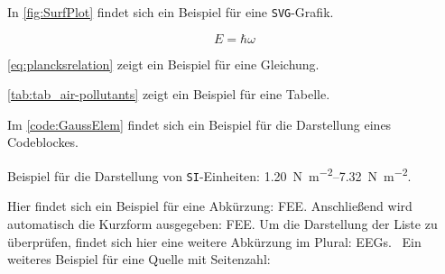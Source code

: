 \newpage
\lipsum[24]



In \autoref{fig:SurfPlot} findet sich ein Beispiel für eine \texttt{SVG}-Grafik. \lipsum[13]

\lipsum[32]

\begin{equation}
	E = \hbar \omega
	\label{eq:plancksrelation}
\end{equation}

\autoref{eq:plancksrelation} zeigt ein Beispiel für eine Gleichung. \lipsum

\lipsum[27]



\autoref{tab:tab_air-pollutants} zeigt ein Beispiel für eine Tabelle. \lipsum

\lipsum[14]



Im \autoref{code:GaussElem} findet sich ein Beispiel für die Darstellung eines Codeblockes. \lipsum

\lipsum[18] Beispiel für die Darstellung von \texttt{SI}-Einheiten: \SIrange{1.20}{7.32}{\newton\per\square\meter}. \lipsum

Hier findet sich ein Beispiel für eine Abkürzung: \gls{FEE}. Anschließend wird automatisch die Kurzform ausgegeben: \gls{FEE}. Um die Darstellung der Liste zu überprüfen, findet sich hier eine weitere Abkürzung im Plural: \glspl{EEG}. \lipsum~Ein weiteres Beispiel für eine Quelle mit Seitenzahl: \cite[][vgl. S. 12]{WIKUE2006}